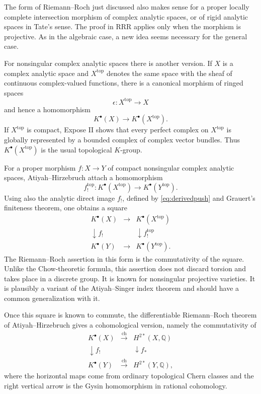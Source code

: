 \documentclass[11pt]{article}
\theoremstyle{plain}
\theoremstyle{definition}
\theoremstyle{remark}
\newcommand{\QQ}{\mathbb Q}
\providecommand{\ch}{\operatorname{ch}}
\begin{document}
The form of Riemann--Roch just discussed also makes sense for a proper locally complete intersection morphism of complex analytic spaces, or of rigid analytic spaces in Tate's sense. The proof in RRR applies only when the morphism is projective. As in the algebraic case, a new idea seems necessary for the general case.

For nonsingular complex analytic spaces there is another version. If $X$ is a complex analytic space and $X^{\mathrm{top}}$ denotes the same space with the sheaf of continuous complex-valued functions, there is a canonical morphism of ringed spaces
\[
   \epsilon:X^{\mathrm{top}}\to X
\]
and hence a homomorphism
\begin{equation}\label{eq:topK}
   K^{\bullet}(X)\to K^{\bullet}(X^{\mathrm{top}}).
\end{equation}
If $X^{\mathrm{top}}$ is compact, Expose II shows that every perfect complex on $X^{\mathrm{top}}$ is globally represented by a bounded complex of complex vector bundles. Thus $K^{\bullet}(X^{\mathrm{top}})$ is the usual topological $K$-group.

For a proper morphism $f:X\to Y$ of compact nonsingular complex analytic spaces, Atiyah--Hirzebruch attach a homomorphism
\[
   f^{\mathrm{top}}_!:K^{\bullet}(X^{\mathrm{top}})\to K^{\bullet}(Y^{\mathrm{top}}).
\]
Using also the analytic direct image $f_!$, defined by \eqref{eq:derivedpush} and Grauert's finiteness theorem, one obtains a square
\[
\begin{array}{ccc}
K^{\bullet}(X) & \longrightarrow & K^{\bullet}(X^{\mathrm{top}}) \\
\downarrow f_! & & \downarrow f^{\mathrm{top}}_! \\
K^{\bullet}(Y) & \longrightarrow & K^{\bullet}(Y^{\mathrm{top}}).
\end{array}
\]
The Riemann--Roch assertion in this form is the commutativity of the square. Unlike the Chow-theoretic formula, this assertion does not discard torsion and takes place in a discrete group. It is known for nonsingular projective varieties. It is plausibly a variant of the Atiyah--Singer index theorem and should have a common generalization with it.

Once this square is known to commute, the differentiable Riemann--Roch theorem of Atiyah--Hirzebruch gives a cohomological version, namely the commutativity of
\[
\begin{array}{ccc}
K^{\bullet}(X) & \xrightarrow{\ch} & H^{2*}(X,\QQ) \\
\downarrow f_! & & \downarrow f_* \\
K^{\bullet}(Y) & \xrightarrow{\ch} & H^{2*}(Y,\QQ),
\end{array}
\]
where the horizontal maps come from ordinary topological Chern classes and the right vertical arrow is the Gysin homomorphism in rational cohomology.
\end{document}
